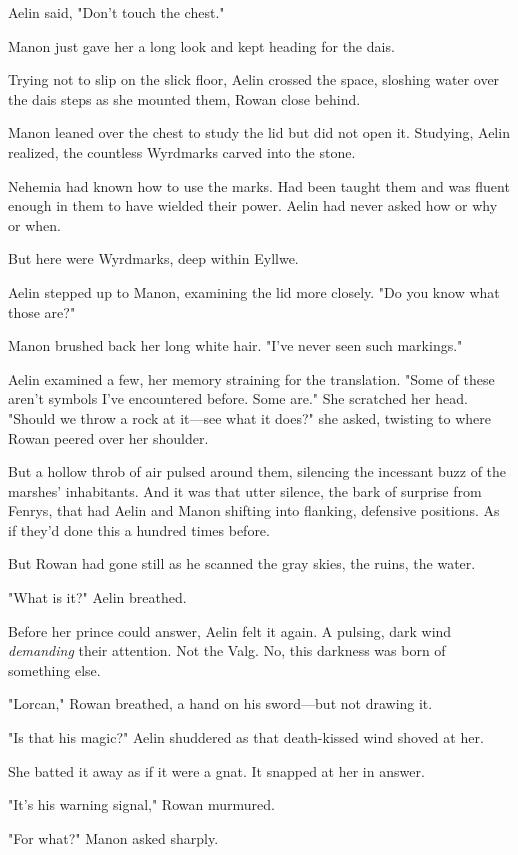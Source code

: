 Aelin said, "Don't touch the chest."

Manon just gave her a long look and kept heading for the dais.

Trying not to slip on the slick floor, Aelin crossed the space, sloshing water over the dais steps as she mounted them, Rowan close behind.

Manon leaned over the chest to study the lid but did not open it.
Studying, Aelin realized, the countless Wyrdmarks carved into the stone.

Nehemia had known how to use the marks.
Had been taught them and was fluent enough in them to have wielded their power.
Aelin had never asked how or why or when.

But here were Wyrdmarks, deep within Eyllwe.

Aelin stepped up to Manon, examining the lid more closely.
"Do you know what those are?"

Manon brushed back her long white hair.
"I've never seen such markings."

Aelin examined a few, her memory straining for the translation.
"Some of these aren't symbols I've encountered before.
Some are."
She scratched her head.
"Should we throw a rock at it---see what it does?"
she asked, twisting to where Rowan peered over her shoulder.

But a hollow throb of air pulsed around them, silencing the incessant buzz of the marshes' inhabitants.
And it was that utter silence, the bark of surprise from Fenrys, that had Aelin and Manon shifting into flanking, defensive positions.
As if they'd done this a hundred times before.

But Rowan had gone still as he scanned the gray skies, the ruins, the water.

"What is it?"
Aelin breathed.

Before her prince could answer, Aelin felt it again.
A pulsing, dark wind \emph{demanding} their attention.
Not the Valg.
No, this darkness was born of something else.

"Lorcan," Rowan breathed, a hand on his sword---but not drawing it.

"Is that his magic?"
Aelin shuddered as that death-kissed wind shoved at her.

She batted it away as if it were a gnat.
It snapped at her in answer.

"It's his warning signal," Rowan murmured.

"For what?"
Manon asked sharply.

